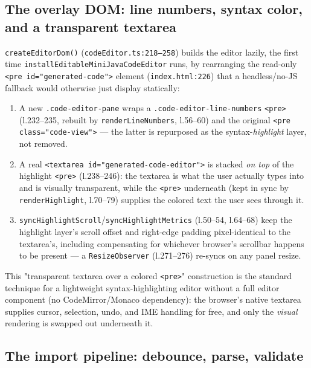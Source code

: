 \documentclass[11pt]{article}
\begin{document}
\subsection{The overlay DOM: line numbers, syntax color, and a transparent textarea}
\label{sec:code-dom}

\texttt{createEditorDom()} (\texttt{codeEditor.ts:218--258}) builds the
editor lazily, the first time \texttt{installEditableMiniJavaCodeEditor}
runs, by rearranging the read-only \texttt{<pre id="generated-code">}
element (\texttt{index.html:226}) that a headless/no-JS fallback would
otherwise just display statically:

\begin{enumerate}
  \item A new \texttt{.code-editor-pane} wraps a \texttt{.code-editor-line-numbers}
        \texttt{<pre>} (l.232--235, rebuilt by \texttt{renderLineNumbers},
        l.56--60) and the original \texttt{<pre class="code-view">} —
        the latter is repurposed as the syntax-\emph{highlight} layer, not
        removed.
  \item A real \texttt{<textarea id="generated-code-editor">} is stacked
        \emph{on top} of the highlight \texttt{<pre>} (l.238--246): the
        textarea is what the user actually types into and is visually
        transparent, while the \texttt{<pre>} underneath (kept in sync by
        \texttt{renderHighlight}, l.70--79) supplies the colored text the
        user sees through it.
  \item \texttt{syncHighlightScroll}/\texttt{syncHighlightMetrics}
        (l.50--54, l.64--68) keep the highlight layer's scroll offset and
        right-edge padding pixel-identical to the textarea's, including
        compensating for whichever browser's scrollbar happens to be
        present — a \texttt{ResizeObserver} (l.271--276) re-syncs on any
        panel resize.
\end{enumerate}
This "transparent textarea over a colored \texttt{<pre>}" construction is
the standard technique for a lightweight syntax-highlighting editor without
a full editor component (no CodeMirror/Monaco dependency): the browser's
native textarea supplies cursor, selection, undo, and IME handling for
free, and only the \emph{visual} rendering is swapped out underneath it.

\subsection{The import pipeline: debounce, parse, validate}
\end{document}
